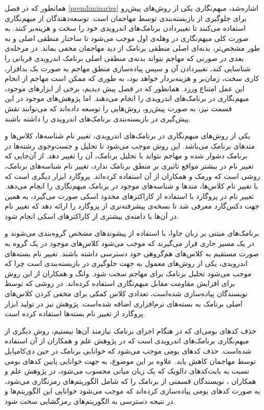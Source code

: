 همانطور که در فصل \ref{premliminaries} اشاره‌شد، مبهم‌نگاری یکی از روش‌های پیش‌رو برای جلوگیری از بازبسته‌بندی توسط مهاجمان است. توسعه‌دهندگان از مبهم‌نگاری استفاده می‌کنند تا تغییردادن برنامک‌های اندرویدی خود را سخت و هزینه‌بر کنند. به صورت کلی مبهم‌نگاری در وهله‌ی اول موجب می‌شود تا ساختار منطقی اصلی و به طور مشخص‌تر، بدنه‌ای اصلی منطقی برنامک از دید مهاجمان مخفی بماند. در مرحله‌ی بعدی در صورتی که مهاجم بتواند بدنه‌‌ی منطقی اصلی برنامک‌ اندرویدی قربانی را شناسایی کند، تغییردادن آن و سپس پیاده‌سازی منطق مهاجم به صورت یک بدافزار، کاری سخت، زمان‌بر و هزینه‌بردار خواهد بود، به طوری که ممکن است مهاجم از انجام این عمل امتناع ورزد. همانطور که در فصل پیش دیدیم، برخی از ابزار‌های موجود، مبهم‌نگاری در برنامک‌های اندرویدی را انجام می‌دهند. اما پژوهش‌های موجود در این قسمت نیز، به صورت پیش‌رو، روش‌هایی را توسعه داده‌اند که می‌توانند نقش پیش‌گیری در بازبسته‌بندی برنامک‌های اندرویدی را داشته باشند.

یکی از روش‌های مبهم‌نگاری در برنامک‌های اندرویدی، تغییر نام شناسه‌ها، کلاس‌ها و متد‌های برنامک می‌باشد. این روش موجب می‌شود تا تحلیل و جست‌وجوی رشته‌ها در برنامک دشوار شده و مهاجم نتواند با تحلیل برنامک، آن را تغییر دهد. از آن‌جایی که تغییر نام در بیشتر مواقع تاثیری بر منطق برنامک ندارد، تغییر نام شناسه‌های برنامک، ‌روشی است که ورمک و همکاران از آن استفاده کرده‌اند. پروگارد ابزار دیگری است که با تغییر نام کلاس‌ها، متد‌ها و شناسه‌های موجود در برنامک مبهم‌نگاری را انجام می‌دهد. تغییر نام در پروگارد با استفاده از کاراکتر‌های محدود اسکی صورت می‌گیرد، به همین جهت دکس‌گارد معرفی شد تا نسخه‌ی پیشرفته‌تری از پروگارد را ارائه دهد که تغییر نام در آن‌ها با دامنه‌ی بیشتری از کاراکتر‌های اسکی انجام شود.

برنامک‌های مبتنی بر زبان جاوا، با استفاده از پیشوند‌های مشخص‌ گروه‌بندی می‌شوند و در یک مسیر جاری قرار می‌گیرند که موجب می‌شود کلاس‌های موجود در یک گروه به صورت مستقیم به کلاس‌های هم‌گروهی خود دسترسی داشته باشند. تغییر نام بسته‌های اندرویدی، یکی از روش‌های معمول به جهت جلوگیری در بازبسته‌بندی است چرا که موجب می‌شود تحلیل برنامک برای مهاجم سخت شود. وانگ و همکاران از این روش برای افزایش مقاومت مقابل مبهم‌نگاری استفاده کرده‌اند. در روشی که توسط نویسندگان پیاده‌سازی شده‌است، تعدادی کلاس کمکی برای مخفی کردن کلاس‌های اصلی برنامک به بسته‌های نرم‌افزاری اضافه‌ شده‌است. پژوهش نیز در تولید ابزار پروگارد از تغییر نام بسته‌ها استفاده کرده‌ است.

حذف کد‌های بومی‌ای که در هنگام اجرای برنامک نیازمند آن‌ها نیستیم، روش دیگری از مبهم‌نگاری برنامک‌های اندرویدی است که در پژوهش علم و همکاران  از آن استفاده شده‌است. حذف کد‌های بومی موجب می‌شود که خوانایی برنامک در حین دی‌کامپایل توسط مهاجمان کاهش یابد. علاوه بر این موضوع، به جهت خوانایی پایین کد‌های بومی نسبت به بایت‌کد‌های دالویک که یک زبان میانی محسوب می‌شود، در پژوهش علم و همکاران ، نویسندگان قسمتی از برنامک را که شامل الگوریتم‌های رمزنگاری می‌شود، به صورت کد‌های بومی پیاده‌سازی کرده‌اند که موجب می‌شود خوانایی این الگوریتم‌ها و در نتیجه دسترسی به الگوریتم‌های رمز‌گشایی سخت شود.

